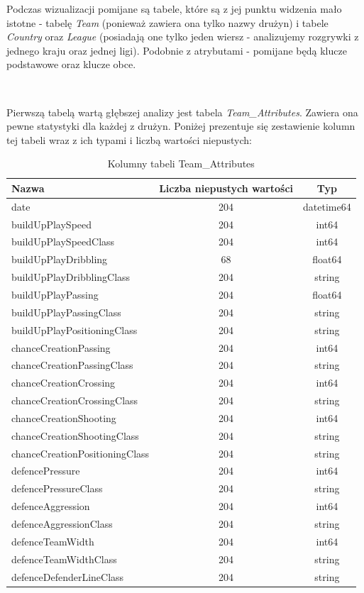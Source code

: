     Podczas wizualizacji pomijane są tabele, które są z jej punktu widzenia mało istotne - tabelę \emph{Team} (ponieważ zawiera ona tylko nazwy drużyn) i tabele \emph{Country} oraz \emph{League} (posiadają one tylko jeden wiersz - analizujemy rozgrywki z jednego kraju oraz jednej ligi). Podobnie z atrybutami - pomijane będą klucze podstawowe oraz klucze obce.
    
    ~
    
    Pierwszą tabelą wartą głębszej analizy jest tabela \emph{Team\_Attributes}. Zawiera ona pewne statystyki dla każdej z drużyn. Poniżej prezentuje się zestawienie kolumn tej tabeli wraz z ich typami i liczbą wartości niepustych:
    
    \begin{table}[H]
    \caption{Kolumny tabeli Team\_Attributes}
    \centering\footnotesize%
    \begin{tabular}{l c c}
    \toprule
        Nazwa & Liczba niepustych wartości & Typ \\
    \midrule
        date & 204 & datetime64 \\
        buildUpPlaySpeed & 204 & int64 \\
        buildUpPlaySpeedClass & 204 & int64 \\
        buildUpPlayDribbling & 68 & float64 \\
        buildUpPlayDribblingClass & 204 & string \\
        buildUpPlayPassing & 204 & float64 \\
        buildUpPlayPassingClass & 204 & string \\
        buildUpPlayPositioningClass & 204 & string \\
        chanceCreationPassing & 204 & int64 \\
        chanceCreationPassingClass & 204 & string \\
        chanceCreationCrossing & 204 & int64 \\ 
        chanceCreationCrossingClass & 204 & string \\        
        chanceCreationShooting & 204 & int64 \\  
        chanceCreationShootingClass & 204 & string \\
        chanceCreationPositioningClass & 204 & string \\
        defencePressure & 204 & int64 \\
        defencePressureClass & 204 & string \\
        defenceAggression & 204 & int64 \\  
        defenceAggressionClass & 204 & string \\
        defenceTeamWidth & 204 & int64 \\
        defenceTeamWidthClass & 204 & string \\
        defenceDefenderLineClass & 204 & string \\
    \bottomrule
    \end{tabular}
    \end{table}
    

